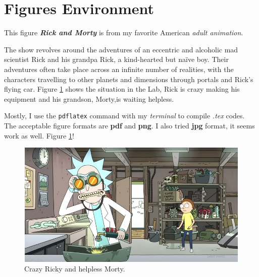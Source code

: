 \documentclass[12pt, letterpaper]{article} %
\begin{document}
\section{Figures Environment} %
\graphicspath{ {./images/} } %
This figure \textit{\textbf{Rick and Morty }} is from my favorite American \textit{adult animation}.

The show revolves around the adventures of an eccentric and alcoholic mad scientist Rick and his grandpa Rick, 
a kind-hearted but naïve boy. Their adventures often take place across an infinite number of realities, with the 
characters travelling to other planets and dimensions through portals and Rick's flying car. Figure \ref{fig:rick} shows 
the situation in the Lab, Rick is crazy making his equipment and his grandson, Morty,is waiting helpless.

Mostly, I use the  {\tt pdflatex} command with my \textit{terminal} to compile \textit{.tex} codes. The acceptable figure 
formats are \textbf{pdf} and \textbf{png}. I also tried \textbf{jpg} format, it seems work as well. 
Figure \ref{fig:rick}! %
\begin{figure}[!t] %
\begin{center} %
  \includegraphics[width=12cm,height=6cm]{rick-morty.png} %
  \caption{Crazy Ricky and helpless Morty.} %
  \label{fig:rick} %
\end{center} %
\end{figure} %
\end{document}
